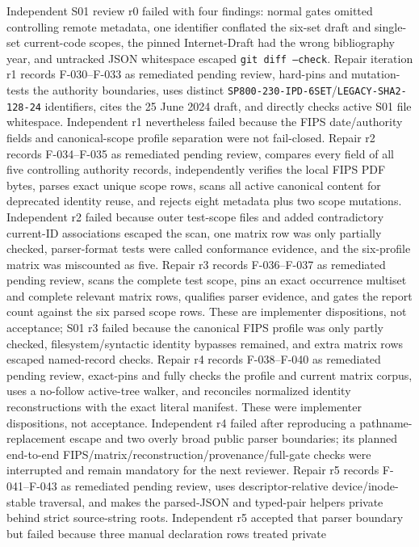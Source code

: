\documentclass[11pt]{article}
\begin{document}
Independent S01 review r0 failed with four findings: normal gates omitted controlling remote
metadata, one identifier conflated the six-set draft and single-set current-code scopes, the pinned
Internet-Draft had the wrong bibliography year, and untracked JSON whitespace escaped
\texttt{git diff --check}. Repair iteration r1 records F-030--F-033 as remediated pending review,
hard-pins and mutation-tests the authority boundaries, uses distinct
\texttt{SP800-230-IPD-6SET}/\texttt{LEGACY-SHA2-128-24} identifiers, cites the 25 June 2024 draft,
and directly checks active S01 file whitespace. Independent r1 nevertheless failed because the FIPS
date/authority fields and canonical-scope profile separation were not fail-closed. Repair r2 records
F-034--F-035 as remediated pending review, compares every field of all five controlling authority
records, independently verifies the local FIPS PDF bytes, parses exact unique scope rows, scans all
active canonical content for deprecated identity reuse, and rejects eight metadata plus two scope
mutations. Independent r2 failed because outer test-scope files and added contradictory current-ID
associations escaped the scan, one matrix row was only partially checked, parser-format tests were
called conformance evidence, and the six-profile matrix was miscounted as five. Repair r3 records
F-036--F-037 as remediated pending review, scans the complete test scope, pins an exact occurrence
multiset and complete relevant matrix rows, qualifies parser evidence, and gates the report count
against the six parsed scope rows. These are implementer dispositions, not acceptance; S01 r3
failed because the canonical FIPS profile was only partly checked, filesystem/syntactic identity
bypasses remained, and extra matrix rows escaped named-record checks. Repair r4 records
F-038--F-040 as remediated pending review, exact-pins and fully checks the profile and current matrix
corpus, uses a no-follow active-tree walker, and reconciles normalized identity reconstructions with
the exact literal manifest. These were implementer dispositions, not acceptance. Independent r4
failed after reproducing a pathname-replacement escape and two overly broad
public parser boundaries; its planned end-to-end FIPS/matrix/reconstruction/provenance/full-gate
checks were interrupted and remain mandatory for the next reviewer. Repair r5 records F-041--F-043
as remediated pending review, uses descriptor-relative device/inode-stable traversal, and makes the
parsed-JSON and typed-pair helpers private behind strict source-string roots. Independent r5
accepted that parser boundary but failed because three manual declaration rows treated private
\end{document}
